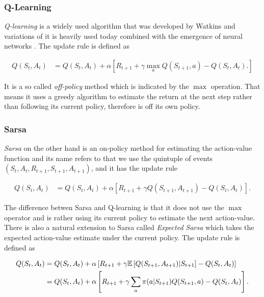 \documentclass[result.tex]{subfiles}
\begin{document}
    \subsubsection*{Q-Learning}

    \textit{Q-learning} is a widely used algorithm that was developed by Watkins \cite{watkins1989learning} and variations of it is heavily used today combined with the emergence of neural networks \cite{van2016deep}. The update rule is defined as

    \begin{align*}
        Q(S_t, A_t) &=
        Q(S_t , A_t) +
        \alpha \left[
        R_{t + 1} +
        \gamma \max_a Q(S_{t + 1}, a) - Q(S_t, A_t).
        \right]
    \end{align*}

    It is a so called \textit{off-policy} method which is indicated by the $\max$ operation. That means it uses a greedy algorithm to estimate the return at the next step rather than following its current policy, therefore is off its own policy.

    \subsubsection*{Sarsa}

    \textit{Sarsa} on the other hand is an on-policy method for estimating the action-value function and its name refers to that we use the quintuple of events $(S_t, A_t, R_{t + 1}, S_{t + 1}, A_{t + 1})$, and it has the update rule

    \begin{align*}
        Q(S_t, A_t) &=
        Q(S_t , A_t) +
        \alpha \left[
        R_{t + 1} +
        \gamma Q(S_{t + 1}, A_{t + 1}) - Q(S_t, A_t)
        \right].
    \end{align*}

    The difference betwen Sarsa and Q-learning is that it does not use the $\max$ operator and is rather using its current policy to estimate the next action-value. There is also a natural extension to Sarsa called \textit{Expected Sarsa} which takes the expected action-value estimate under the current policy. The update rule is defined as

    \begin{align*}
        Q(S_t, A_t) &=
        Q(S_t , A_t) +
        \alpha \left[
        R_{t + 1} +
        \gamma \mathbb{E} \left[ Q(S_{t + 1}, A_{t + 1}) | S_{t + 1}
        \right] -
        Q(S_t, A_t)
        \right] \\
        &=
        Q(S_t , A_t) +
        \alpha \left[
        R_{t + 1} +
        \gamma \sum_a \pi (a | S_{t + 1}) Q(S_{t + 1}, a) -
        Q(S_t, A_t)
        \right].
    \end{align*}
\end{document}
